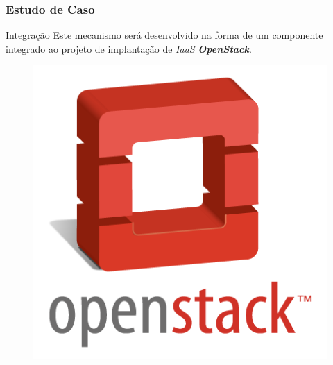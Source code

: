 
\frame
{
\frametitle{Estudo de Caso}
\begin{block}{Integração}
	Este mecanismo será desenvolvido na forma de um componente integrado ao projeto de implantação de \textit{IaaS}  \textbf{\textit{OpenStack}}.
\end{block}
   \begin{figure}[bhtp]
     \centering \includegraphics[scale=.15]{images/openstack-logo.png}
	 \vspace{-8mm}
   \end{figure}
}


